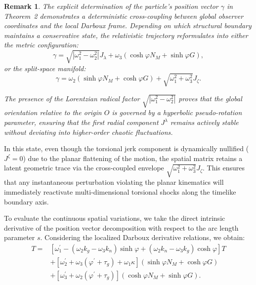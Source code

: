 \documentclass[reqno]{amsart}
\theoremstyle{plain}
\newtheorem{remark}{Remark}
\numberwithin{equation}{section}
\begin{document}
\begin{remark}
The explicit determination of the particle’s position vector $\gamma$ in Theorem~2 demonstrates a deterministic cross-coupling between global observer coordinates and the local Darboux frame. Depending on which structural boundary maintains a conservative state, the relativistic trajectory reformulates into either the metric configuration:
\begin{equation*}
\gamma = \sqrt{|\omega_1^2 - \omega_2^2|} J_\lambda + \omega_3 \left( \cosh \varphi N_M + \sinh \varphi G \right), 
\end{equation*}
or the split-space manifold:
\begin{equation*}
\gamma = \omega_2 \left( \sinh \varphi N_M + \cosh \varphi G \right) + \sqrt{\omega_1^2 + \omega_3^2} J_{\zeta}. 
\end{equation*}

The presence of the Lorentzian radical factor $\sqrt{|\omega_1^2 - \omega_2^2|}$ proves that the global orientation relative to the origin $O$ is governed by a hyperbolic pseudo-rotation parameter, ensuring that the first radial component $J^\lambda$ remains actively stable without deviating into higher-order chaotic fluctuations.
\end{remark}






In this state, even though the torsional jerk component is dynamically nullified ($J^\zeta = 0$) due to the planar flattening of the motion, the spatial matrix retains a latent geometric trace via the cross-coupled envelope $\sqrt{\omega_1^2 + \omega_3^2}J_\zeta$. This ensures that any instantaneous perturbation violating the planar kinematics will immediately reactivate multi-dimensional torsional shocks along the timelike boundary axis.

To evaluate the continuous spatial variations, we take the direct intrinsic derivative of the position vector decomposition with respect to the arc length parameter $s$. Considering the localized Darboux derivative relations, we obtain:
\begin{align}
T = {} & \left[ \omega_{1}^{\prime} - (\omega_{2}k_{g} - \omega_{3}k_{n})\sinh\varphi + (\omega_{2}k_{n} - \omega_{3}k_{g})\cosh\varphi \right] T \nonumber \\
& + \left[ \omega_{2}^{\prime} + \omega_{3}(\varphi^{\prime} + \tau_{g}) + \omega_{1}\kappa \right] (\sinh\varphi N_{M} + \cosh\varphi G) \nonumber \\
& + \left[ \omega_{3}^{\prime} + \omega_{2}(\varphi^{\prime} + \tau_{g}) \right] (\cosh\varphi N_{M} + \sinh\varphi G). \tag{3.29}
\end{align}
\end{document}
